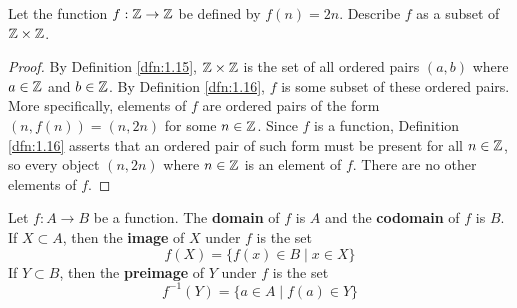 \documentclass[../main.tex]{subfiles}
\begin{document}
\begin{exercise}\label{exr:1.17}
    Let the function $f:\mathbb{Z}\to\mathbb{Z}$ be defined by $f(n)=2n$. Describe $f$ as a subset of $\mathbb{Z}\times\mathbb{Z}$.
    \begin{proof}
        By Definition \ref{dfn:1.15}, $\mathbb{Z}\times\mathbb{Z}$ is the set of all ordered pairs $(a,b)$ where $a\in\mathbb{Z}$ and $b\in\mathbb{Z}$. By Definition \ref{dfn:1.16}, $f$ is some subset of these ordered pairs. More specifically, elements of $f$ are ordered pairs of the form $(n,f(n))=(n,2n)$ for some $n\in\mathbb{Z}$. Since $f$ is a function, Definition \ref{dfn:1.16} asserts that an ordered pair of such form must be present for all $n\in\mathbb{Z}$, so every object $(n,2n)$ where $n\in\mathbb{Z}$ is an element of $f$. There are no other elements of $f$.
    \end{proof}
\end{exercise}

\begin{definition}\label{dfn:1.18}
    Let $f:A\to B$ be a function. The \textbf{domain} of $f$ is $A$ and the \textbf{codomain} of $f$ is $B$. If $X\subset A$, then the \textbf{image} of $X$ under $f$ is the set
    \begin{equation*}
        f(X) = \{f(x)\in B\mid x\in X\}
    \end{equation*}
    If $Y\subset B$, then the \textbf{preimage} of $Y$ under $f$ is the set
    \begin{equation*}
        f^{-1}(Y) = \{a\in A\mid f(a)\in Y\}
    \end{equation*}
\end{definition}
\end{document}
